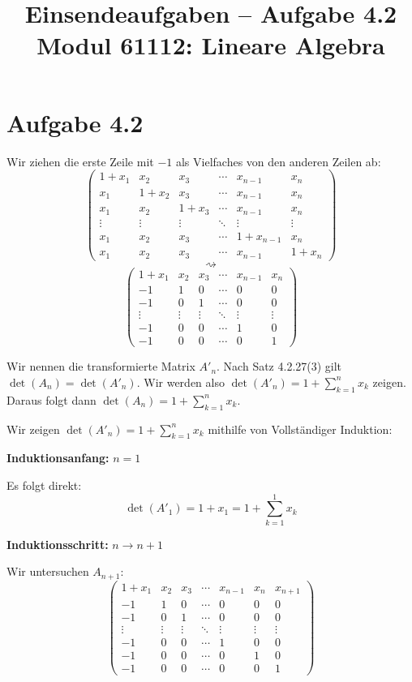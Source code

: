 \documentclass[a4paper,12pt]{article}
\title{Einsendeaufgaben -- Aufgabe 4.2\\[0.5em]
\large Modul 61112: Lineare Algebra}
\author{}
\date{}
\begin{document}
\maketitle

\section*{Aufgabe 4.2}

Wir ziehen die erste Zeile mit $-1$ als Vielfaches von den anderen Zeilen ab:
\[
\begin{pmatrix}
1+x_1 & x_2   & x_3   & \cdots & x_{n-1} & x_n \\
x_1   & 1+x_2 & x_3   & \cdots & x_{n-1} & x_n \\
x_1   & x_2   & 1+x_3 & \cdots & x_{n-1} & x_n \\
\vdots & \vdots & \vdots & \ddots & \vdots & \vdots \\
x_1   & x_2   & x_3   & \cdots & 1+x_{n-1} & x_n \\
x_1   & x_2   & x_3   & \cdots & x_{n-1} & 1+x_n
\end{pmatrix}
\]
\[
\rightsquigarrow
\]
\[
\begin{pmatrix}
1+x_1 & x_2 & x_3 & \cdots & x_{n-1} & x_n \\
-1    & 1   & 0   & \cdots & 0       & 0 \\
-1    & 0   & 1   & \cdots & 0       & 0 \\
\vdots & \vdots & \vdots & \ddots & \vdots & \vdots \\
-1    & 0   & 0   & \cdots & 1       & 0 \\
-1    & 0   & 0   & \cdots & 0       & 1
\end{pmatrix}
\]

Wir nennen die transformierte Matrix $A'_n$. Nach Satz 4.2.27(3) gilt $\det(A_n) = \det(A'_n)$. Wir werden also $\det(A'_n) = 1 + \sum_{k=1}^{n} x_k$ zeigen. Daraus folgt dann $\det(A_n) = 1 + \sum_{k=1}^{n} x_k$.

Wir zeigen $\det(A'_n) = 1 + \sum_{k=1}^{n} x_k$ mithilfe von Vollständiger Induktion:

\textbf{Induktionsanfang:} $n=1$

Es folgt direkt:
\[
\det(A'_1) = 1 + x_1 = 1 + \sum_{k=1}^{1} x_k
\]

\textbf{Induktionsschritt:} $n \to n+1$

Wir untersuchen $A_{n+1}$:
\[
\begin{pmatrix}
1+x_1 & x_2 & x_3 & \cdots & x_{n-1} & x_n & x_{n+1} \\
-1    & 1   & 0   & \cdots & 0       & 0   & 0 \\
-1    & 0   & 1   & \cdots & 0       & 0   & 0 \\
\vdots & \vdots & \vdots & \ddots & \vdots & \vdots & \vdots \\
-1    & 0   & 0   & \cdots & 1       & 0   & 0 \\
-1    & 0   & 0   & \cdots & 0       & 1   & 0 \\
-1    & 0   & 0   & \cdots & 0       & 0   & 1
\end{pmatrix}
\]
\end{document}
